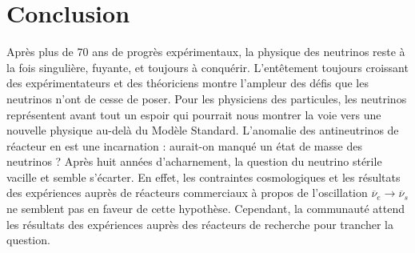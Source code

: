 

\chapter*{Conclusion}
\label{chap:conclusion}



Après plus de 70 ans de progrès expérimentaux, la physique des neutrinos reste à la fois singulière, fuyante, et toujours à conquérir. L'entêtement toujours croissant des expérimentateurs et des théoriciens montre l'ampleur des défis que les neutrinos n'ont de cesse de poser. Pour les physiciens des particules, les neutrinos représentent avant tout un espoir qui pourrait nous montrer la voie vers une nouvelle physique au-delà du Modèle Standard. L'anomalie des antineutrinos de réacteur en est une incarnation : aurait-on manqué un état de masse des neutrinos ? Après huit années d'acharnement, la question du neutrino stérile vacille et semble s'écarter. En effet, les contraintes cosmologiques et les résultats des expériences auprès de réacteurs commerciaux à propos de l'oscillation $\overline{\nu}_e \rightarrow \overline{\nu}_s$ ne semblent pas en faveur de cette hypothèse. Cependant, la communauté attend les résultats des expériences auprès des réacteurs de recherche pour trancher la question.\\

